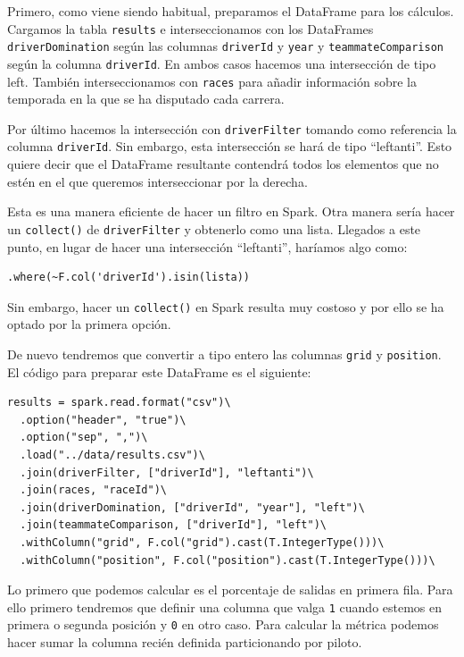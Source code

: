 \documentclass[12pt,twoside,titlepage]{report}
\newcommand{\quotes}[1]{``#1''}
\begin{document}
Primero, como viene siendo habitual, preparamos el DataFrame para los cálculos. Cargamos la tabla \texttt{results} e interseccionamos con los DataFrames \texttt{driverDomination} según las columnas \texttt{driverId} y \texttt{year} y \texttt{teammateComparison} según la columna \texttt{driverId}. En ambos casos hacemos una intersección de tipo left. También interseccionamos con \texttt{races} para añadir información sobre la temporada en la que se ha disputado cada carrera.

Por último hacemos la intersección con \texttt{driverFilter} tomando como referencia la columna \texttt{driverId}. Sin embargo, esta intersección se hará de tipo \quotes{leftanti}. Esto quiere decir que el DataFrame resultante contendrá todos los elementos que no estén en el que queremos interseccionar por la derecha.

Esta es una manera eficiente de hacer un filtro en Spark. Otra manera sería hacer un \texttt{collect()} de \texttt{driverFilter} y obtenerlo como una lista. Llegados a este punto, en lugar de hacer una intersección \quotes{leftanti}, haríamos algo como:

\begin{lstlisting}
.where(~F.col('driverId').isin(lista))
\end{lstlisting}

Sin embargo, hacer un \texttt{collect()} en Spark resulta muy costoso y por ello se ha optado por la primera opción.

De nuevo tendremos que convertir a tipo entero las columnas \texttt{grid} y \texttt{position}. El código para preparar este DataFrame es el siguiente:

\begin{lstlisting}
results = spark.read.format("csv")\
  .option("header", "true")\
  .option("sep", ",")\
  .load("../data/results.csv")\
  .join(driverFilter, ["driverId"], "leftanti")\
  .join(races, "raceId")\
  .join(driverDomination, ["driverId", "year"], "left")\
  .join(teammateComparison, ["driverId"], "left")\
  .withColumn("grid", F.col("grid").cast(T.IntegerType()))\
  .withColumn("position", F.col("position").cast(T.IntegerType()))\
\end{lstlisting}

Lo primero que podemos calcular es el porcentaje de salidas en primera fila. Para ello primero tendremos que definir una columna que valga \texttt{1} cuando estemos en primera o segunda posición y \texttt{0} en otro caso. Para calcular la métrica podemos hacer sumar la columna recién definida particionando por piloto.
\end{document}
